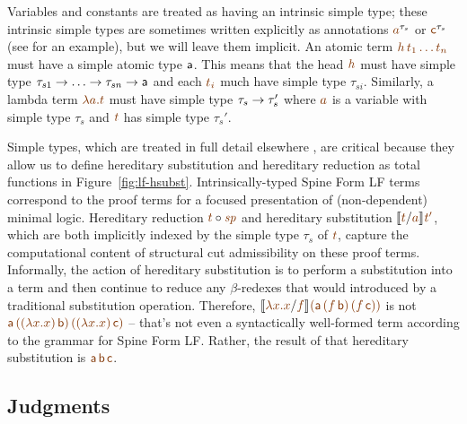 Variables and constants are treated as having an intrinsic simple
type; these intrinsic simple types are sometimes written explicitly as
annotations $\lf{a}^{\tau_s}$ or $\lf{\sf c}^{\tau_s}$ (see
\cite{pfenning08church} for an example), but we will leave them
implicit.  An atomic term $\lf{h\,t_1\ldots t_n}$ must have a
simple atomic type ${\sf a}$. This means that the head $\lf h$ must
have simple type $\tau_{s1} \rightarrow \ldots \rightarrow \tau_{sn} \rightarrow
{\sf a}$ and each $\lf{t_i}$ much have simple type
$\tau_{si}$. Similarly, a lambda term $\lf{\lambda a. t}$ must have
simple type $\tau_s \rightarrow \tau_s'$ where $\lf a$ is a variable with
simple type $\tau_s$ and $\lf t$ has simple type $\tau_s'$.

Simple types, which are treated in full detail elsewhere
\cite{harper07mechanizing,reed09hybrid}, are critical because they
allow us to define hereditary substitution and hereditary reduction as
total functions in Figure~\ref{fig:lf-hsubst}. Intrinsically-typed
Spine Form LF terms correspond to the proof terms for a focused
presentation of (non-dependent) minimal logic. Hereditary reduction
$\subst{\lf{t}}{\lf{\spi}}$ and hereditary substitution $\rsubst{\lf
  t}{\lf a}{\lf{t'}}$, which are both implicitly indexed by the simple
type $\tau_s$ of $\lf t$, capture the computational content of
structural cut admissibility on these proof terms. Informally, the
action of hereditary substitution is to perform a substitution into a
term and then continue to reduce any $\beta$-redexes that would
introduced by a traditional substitution operation.  Therefore,
$\rsubst{\lf{\lambda x. x}}{\lf f}{\lf{({\sf a}\,(f\,{\sf
      b})\,(f\,{\sf c}))}}$ is not $\lf{{\sf a}\,((\lambda x.x)\,{\sf
    b})\,((\lambda x.x)\,{\sf c})}$ -- that's not even a syntactically
well-formed term according to the grammar for Spine Form LF. Rather,
the result of that hereditary substitution is $\lf{{\sf a}\,{\sf
    b}\,{\sf c}}$.

\subsection{Judgments}

